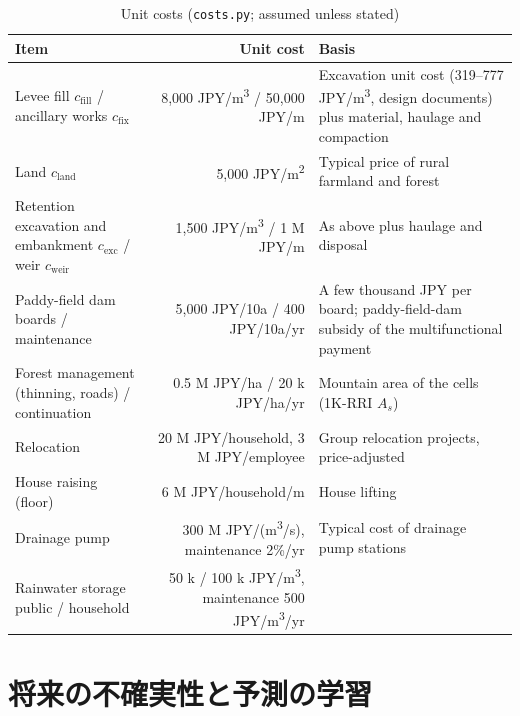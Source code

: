 \documentclass[a4paper,10pt]{ltjsarticle}
\begin{document}
\begin{table}[tbp]
\centering\footnotesize
\caption{Unit costs (\texttt{costs.py}; assumed unless stated)}
\label{tab:unitcost}
\begin{tabularx}{\textwidth}{@{}l r L@{}}
\toprule
Item & Unit cost & Basis \\
\midrule
Levee fill $c_{\mathrm{fill}}$ / ancillary works $c_{\mathrm{fix}}$ & 8,000 JPY/m\textsuperscript{3} / 50,000 JPY/m & Excavation unit cost (319--777 JPY/m\textsuperscript{3}, design documents) plus material, haulage and compaction \\
Land $c_{\mathrm{land}}$ & 5,000 JPY/m\textsuperscript{2} & Typical price of rural farmland and forest \\
Retention excavation and embankment $c_{\mathrm{exc}}$ / weir $c_{\mathrm{weir}}$ & 1,500 JPY/m\textsuperscript{3} / 1 M JPY/m & As above plus haulage and disposal \\
Paddy-field dam boards / maintenance & 5,000 JPY/10a / 400 JPY/10a/yr & A few thousand JPY per board; paddy-field-dam subsidy of the multifunctional payment \\
Forest management (thinning, roads) / continuation & 0.5 M JPY/ha / 20 k JPY/ha/yr & Mountain area of the cells (1K-RRI $A_s$) \\
Relocation & 20 M JPY/household, 3 M JPY/employee & Group relocation projects, price-adjusted \\
House raising (floor) & 6 M JPY/household/m & House lifting \\
Drainage pump & 300 M JPY/(m\textsuperscript{3}/s), maintenance 2\%/yr & Typical cost of drainage pump stations \\
Rainwater storage public / household & 50 k / 100 k JPY/m\textsuperscript{3}, maintenance 500 JPY/m\textsuperscript{3}/yr & \\
\bottomrule
\end{tabularx}
\end{table}



\section{将来の不確実性と予測の学習}
\label{sec:uncertainty}
\end{document}

